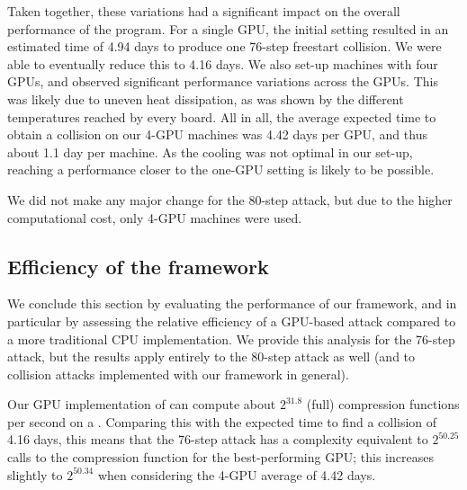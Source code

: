 Taken together, these variations had a significant impact on the overall performance of the program. For a single GPU, the initial setting resulted in an estimated
time of 4.94 days to produce one 76-step freestart collision. We were able to eventually reduce this to 4.16 days. We also set-up machines with four GPUs, and observed significant
performance variations across the GPUs. This was likely due to uneven heat dissipation, as was shown by the different temperatures reached by every board. All in all, the
average expected time to obtain a collision on our 4-GPU machines was 4.42 days per GPU, and thus about 1.1 day per machine. As the cooling was not optimal in our set-up,
reaching a performance closer to the one-GPU setting is likely to be possible.

We did not make any major change for the 80-step attack, but due to the higher computational cost, only 4-GPU machines were used.

\FloatBarrier

\subsection{Efficiency of the framework}
\label{sec:effi_fw}

We conclude this section by evaluating the performance of our framework, and in particular by assessing the relative efficiency of a GPU-based attack compared to a more traditional CPU implementation.
We provide this analysis for the 76-step attack, but the results apply entirely to the 80-step attack as well (and to \shaone collision attacks implemented with our framework in general).


Our GPU implementation of \shaone can compute about $2^{31.8}$ (full) \shaone compression functions per second on a \gtx.
Comparing this with the expected time to find a collision of 4.16 days, this means that the 76-step attack has a complexity equivalent to $2^{50.25}$ calls to the compression function for the
best-performing GPU; this increases slightly to $2^{50.34}$ when considering the 4-GPU average of 4.42 days.

